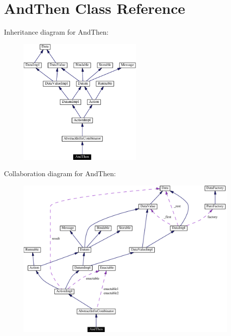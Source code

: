 \hypertarget{classAndThen}{
\section{And\-Then  Class Reference}
\label{classAndThen}
}
Inheritance diagram for And\-Then:\begin{figure}[H]
\begin{center}
\leavevmode
\includegraphics[width=170pt]{classAndThen__inherit__graph}
\end{center}
\end{figure}
Collaboration diagram for And\-Then:\begin{figure}[H]
\begin{center}
\leavevmode
\includegraphics[width=308pt]{classAndThen__coll__graph}
\end{center}
\end{figure}

